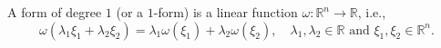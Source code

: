 A form of degree $1$ (or a $1$-form) is a linear function $\omega: \mathbb{R}^n \rightarrow \mathbb{R}$, i.e.,
$$\omega(\lambda_1 \xi_1 + \lambda_2 \xi_2) = \lambda_1 \omega(\xi_1) + \lambda_2 \omega(\xi_2), \quad \lambda_1, \lambda_2 \in \mathbb{R} \text{ and } \xi_1, \xi_2 \in \mathbb{R}^n.$$

